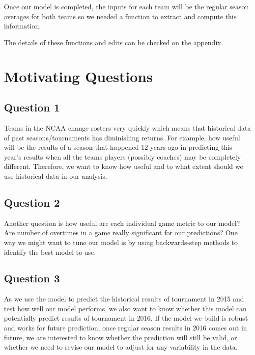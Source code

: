 \documentclass{article} %
\begin{document}
Once our model is completed, the inputs for each team will be the regular season averages for both teams so we needed a function to extract and compute this information.

The details of these functions and edits can be checked on the appendix.

\section{Motivating Questions}

\subsection{Question 1}

Teams in the NCAA change rosters very quickly which means that historical data of past seasons/tournaments has diminishing returns. For example, how useful will be the results of a season that happened 12 years ago in predicting this year's results when all the teams players (possibly coaches) may be completely different. Therefore, we want to know how useful and to what extent should we use historical data in our analysis.


\subsection{Question 2}

Another question is how useful are each individual game metric to our model? Are number of overtimes in a game really significant for our predictions? One way we might want to tune our model is by using backwards-step methods to identify the best model to use.



\subsection{Question 3}

As we use the model to predict the historical results of tournament in 2015 and test how well our model performs, we also want to know whether this model can potentially predict results of tournament in 2016. If the model we build is robust and works for future prediction, once regular season results in 2016 comes out in future, we are interested to know whether the prediction will still be valid, or whether we need to revise our model to adjust for any variability in the data.


  
\end{document}
